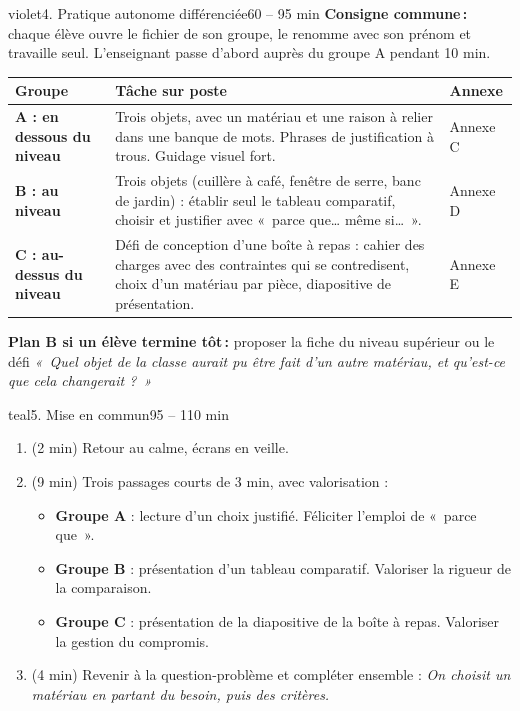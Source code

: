\documentclass[11pt,a4paper]{article}
\begin{document}
\begin{etape}{violet}{4. Pratique autonome différenciée}{60 -- 95 min}
\textbf{Consigne commune\,:} chaque élève ouvre le fichier de son groupe, le renomme avec son prénom et travaille seul. L'enseignant passe d'abord auprès du groupe A pendant 10 min.

\medskip
\begin{tabularx}{\linewidth}{>{\bfseries}p{3cm}Y p{3.2cm}}
\toprule
Groupe & Tâche sur poste & Annexe\\
\midrule
A : en dessous du niveau &
Trois objets, avec un matériau et une raison à relier dans une banque de mots. Phrases de justification à trous. Guidage visuel fort. & Annexe C\\
B : au niveau &
Trois objets (cuillère à café, fenêtre de serre, banc de jardin) : établir seul le tableau comparatif, choisir et justifier avec «~parce que\ldots{} même si\ldots~». & Annexe D\\
C : au-dessus du niveau &
Défi de conception d'une boîte à repas : cahier des charges avec des contraintes qui se contredisent, choix d'un matériau par pièce, diapositive de présentation. & Annexe E\\
\bottomrule
\end{tabularx}

\medskip
\textbf{Plan B si un élève termine tôt\,:} proposer la fiche du niveau supérieur ou le défi \textit{«~Quel objet de la classe aurait pu être fait d'un autre matériau, et qu'est-ce que cela changerait ?~»}
\end{etape}

\begin{etape}{teal}{5. Mise en commun}{95 -- 110 min}
\begin{enumerate}
 \item (2 min) Retour au calme, écrans en veille.
 \item (9 min) Trois passages courts de 3 min, avec valorisation :
 \begin{itemize}
  \item \textbf{Groupe A} : lecture d'un choix justifié. Féliciter l'emploi de «~parce que~».
  \item \textbf{Groupe B} : présentation d'un tableau comparatif. Valoriser la rigueur de la comparaison.
  \item \textbf{Groupe C} : présentation de la diapositive de la boîte à repas. Valoriser la gestion du compromis.
 \end{itemize}
 \item (4 min) Revenir à la question-problème et compléter ensemble : \textit{On choisit un matériau en partant du besoin, puis des critères.}
\end{enumerate}
\end{etape}
\end{document}
